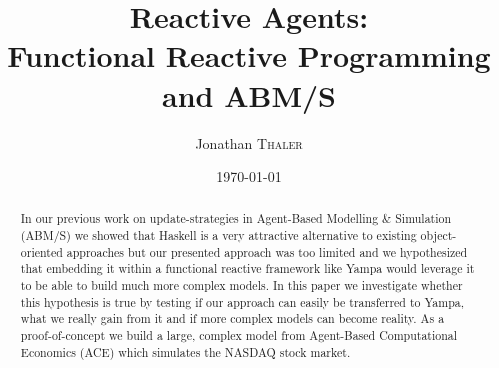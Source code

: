 \documentclass{article}
\title{Reactive Agents:\\Functional Reactive Programming and ABM/S} %
\author{Jonathan \textsc{Thaler}} %
\date{\today} %
\begin{document}
\maketitle %

\begin{abstract}
In our previous work on update-strategies in Agent-Based Modelling \& Simulation (ABM/S) we showed that Haskell is a very attractive alternative to existing object-oriented approaches but our presented approach was too limited and we hypothesized that embedding it within a functional reactive framework like Yampa would leverage it to be able to build much more complex models. In this paper we investigate whether this hypothesis is true by testing if our approach can easily be transferred to Yampa, what we really gain from it and if more complex models can become reality. As a proof-of-concept we build a large, complex model from Agent-Based Computational Economics (ACE) which simulates the NASDAQ stock market.
\end{abstract}















\newpage



\end{document}
